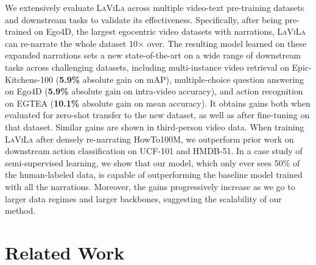 \documentclass[10pt,twocolumn,letterpaper]{article}
\newcommand{\ours}{\textsc{LaViLa}\xspace}
\begin{document}
We extensively evaluate \ours across multiple video-text pre-training datasets and downstream tasks to validate its effectiveness.
Specifically, after being pre-trained on Ego4D, the largest egocentric video datasets with narrations, \ours can re-narrate the whole dataset 10$\times$ over. The resulting model learned on these expanded narrations sets a new state-of-the-art on
a wide range of downstream tasks across challenging datasets, including multi-instance video retrieval on Epic-Kitchens-100 ({\bf 5.9\%} absolute gain on mAP), multiple-choice question answering on Ego4D ({\bf 5.9\%} absolute gain on intra-video accuracy), and action recognition on EGTEA ({\bf 10.1\%} absolute gain on mean accuracy). It obtains gains both when evaluated for zero-shot transfer to the new dataset, as well as after fine-tuning on that dataset.
Similar gains are shown in third-person video data. When training \ours after densely re-narrating HowTo100M, we outperform prior work on downstream action classification on UCF-101 and HMDB-51.
In a case study of semi-supervised learning, we show that our model, which only ever sees 50\% of the human-labeled data, is capable of outperforming the baseline model trained with all the narrations.
Moreover, the gains progressively increase as we go to larger data regimes and larger backbones, suggesting the scalability of our method.

















 \section{Related Work}
\end{document}
